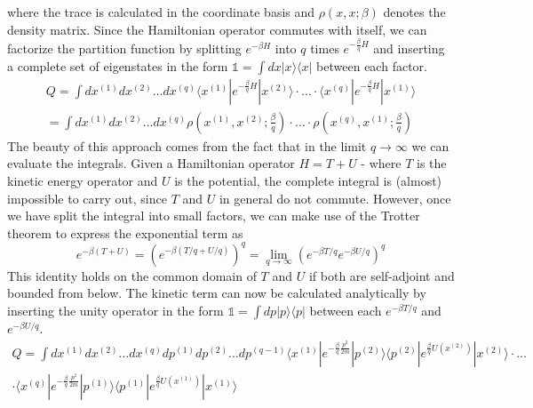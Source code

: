 where the trace is calculated in the coordinate basis and $\rho(x, x; \beta)$ denotes the density matrix. Since the Hamiltonian operator commutes with itself, we can factorize the partition function by splitting $e^{-\beta H}$ into $q$ times $e^{-\frac{\beta}{q} H}$ and inserting a complete set of eigenstates in the form $\mathbb{1} = \int dx  | x \rangle \langle x | $ between each factor.
\begin{equation}
\begin{split}
Q = \int dx^{(1)}dx^{(2)}\ldots dx^{(q)} \langle x^{(1)} | e^{-\frac{\beta}{q} H}| x^{(2)}\rangle\cdot \ldots\cdot \langle x^{(q)} | e^{-\frac{\beta}{q} H}| x^{(1)}\rangle \\
= \int dx^{(1)}dx^{(2)}\ldots dx^{(q)} \rho(x^{(1)}, x^{(2)}; \frac{\beta}{q})\cdot \ldots \cdot \rho(x^{(q)}, x^{(1)}; \frac{\beta}{q})
\end{split}
\end{equation}  
The beauty of this approach comes from the fact that in the limit $q \rightarrow \infty$ we can evaluate the integrals. Given a Hamiltonian operator $H = T + U$ - where  $T$ is the kinetic energy operator and $U$ is the potential, the complete integral is (almost) impossible to carry out, since $T$ and $U$ in general do not commute. However, once we have split the integral into small factors, we can make use of the Trotter theorem to express the exponential term as 
\begin{equation}
e^{-\beta\left(T + U\right)} = \left(e^{-\beta\left(T/q + U/q\right)}\right)^q = \lim_{q \rightarrow \infty}\left(e^{-\beta T/q}e^{-\beta U/q}\right)^q 
\end{equation}
This identity holds on the common domain of $T$ and $U$ if both are self-adjoint and bounded from below.  The kinetic term can now be calculated analytically by inserting the unity operator in the form $\mathbb{1} = \int dp  | p \rangle \langle p | $ between each $e^{-\beta T/q}$ and $e^{-\beta U/q}$.
\begin{equation}
\begin{split}
Q = \int dx^{(1)}dx^{(2)} \ldots dx^{(q)}dp^{(1)}dp^{(2)}\ldots dp^{(q-1)} \langle x^{(1)} | e^{-\frac{\beta}{q} \frac{p^2}{2m}}| p^{(2)} \rangle \langle p^{(2)} | e^{\frac{\beta}{q}U(x^{(2)})}| x^{(2)}\rangle\cdot \ldots \\
\cdot \langle x^{(q)} | e^{-\frac{\beta}{q} \frac{p^2}{2m}}| p^{(1)} \rangle \langle p^{(1)} | e^{\frac{\beta}{q}U(x^{(1)})} | x^{(1)}\rangle
\end{split}
\end{equation}
